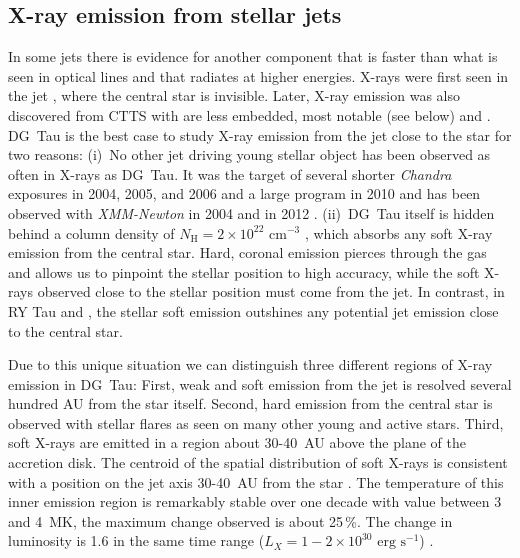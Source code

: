 \subsection{X-ray emission from stellar jets}
\label{sect:introxray}
In some jets there is evidence for another component that is faster than what is seen in optical lines and that radiates at higher energies. X-rays were first seen in the jet  \citep{2001Natur.413..708P,2012A&A...542A.123S}, where the central star is invisible. Later, X-ray emission was also discovered from CTTS with are less embedded, most notable  (see below) and \citep{2014ApJ...788..101S}. DG~Tau is the best case to study X-ray emission from the jet close to the star for two reasons: (i)~No other jet driving young stellar object has been observed as often in X-rays as DG~Tau. It was the target of several shorter \emph{Chandra} exposures in 2004, 2005, and 2006 and a large program in 2010 \citep{2005ApJ...626L..53G,2008A&A...478..797G,2011ASPC..448..617G} and has been observed with \emph{XMM-Newton} in 2004 \citep{2007A&A...468..353G} and in 2012 \citep{SchneiderDGTauXray}. (ii)~DG~Tau itself is hidden behind a column density of $N_{\textrm{H}}=2\times10^{22}\textrm{ cm}^{-3}$ \citep{2008A&A...478..797G}, which absorbs any soft X-ray emission from the central star. Hard, coronal emission pierces through the gas and allows us to pinpoint the stellar position to high accuracy, while the soft X-rays observed close to the stellar position must come from the jet. In contrast, in RY Tau and  \citep{2013A&A...552A.142G}, the stellar soft emission outshines any potential jet emission close to the central star.

Due to this unique situation we can distinguish three different regions of X-ray emission in DG~Tau: First, weak and soft emission from the jet is resolved several hundred AU from the star itself. Second, hard emission from the central star is observed with stellar flares as seen on many other young and active stars. Third, soft X-rays are emitted in a region about 30-40~AU above the plane of the accretion disk. The centroid of the spatial distribution of soft X-rays is consistent with a position on the jet axis 30-40~AU from the star \citep{2008A&A...488L..13S}. The temperature of this inner emission region is remarkably stable over one decade with value between 3 and 4~MK, the maximum change observed is about 25\,\%. The change in luminosity is 1.6 in the same time range ($L_X=1-2\times10^{30}\textrm{ erg s}^{-1}$) \citep{SchneiderDGTauXray}.

